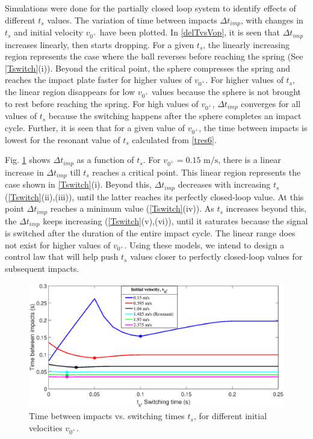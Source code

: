 \documentclass[letterpaper, 10 pt, conference]{ieeeconf}  %
\begin{document}
Simulations were done for the partially closed loop system to identify effects of different $t_s$ values. The variation of time between impacts $\Delta t_{imp}$, with changes in $t_s$ and initial velocity $v_{0^+}$ have been plotted. In \cref{delTvsVop}, it is seen that $\Delta t_{imp}$ increases linearly, then starts dropping. For a given $t_s$, the linearly increasing region represents the case where the ball reverses before reaching the spring (See \cref{Tswitch}(i)). Beyond the critical point, the sphere compresses the spring and reaches the impact plate faster for higher values of $v_{0^+}$. For higher values of $t_s$, the linear region disappears for low $v_{0^+}$ values because the sphere is not brought to rest before reaching the spring. For high values of $v_{0^+}$, $\Delta t_{imp}$ converges for all values of $t_s$ because the switching happens after the sphere completes an impact cycle. Further, it is seen that for a given value of $v_{0^+}$, the time between impacts is lowest for the resonant value of $t_s$ calculated from \cref{tres6}. \par

Fig. \ref{delTvsTs} shows $\Delta t_{imp}$ as a function of $t_s$. For $v_{0^+}=0.15\text{ m/s}$, there is a linear increase in $\Delta t_{imp}$ till $t_s$ reaches a critical point. This linear region represents the case shown in \cref{Tswitch}(i). Beyond this, $\Delta t_{imp}$ decreases with increasing $t_s$ (\cref{Tswitch}(ii),(iii)), until the latter reaches its perfectly closed-loop value. At this point $\Delta t_{imp}$ reaches a minimum value (\cref{Tswitch}(iv)). As $t_s$ increases beyond this, the $\Delta t_{imp}$ keeps increasing (\cref{Tswitch}(v),(vi)), until it saturates because the signal is switched after the duration of the entire impact cycle. The linear range does not exist for higher values of $v_{0^+}$. Using these models, we intend to design a control law that will help push $t_s$ values closer to perfectly closed-loop values for subsequent impacts.


\begin{figure}
	\includegraphics[width=\linewidth]{delTvsTs_R2.eps}
	\caption{Time between impacts vs. switching times $t_s$, for different initial velocities $v_{0^+}$.}
	\label{delTvsTs}
\end{figure}
\end{document}
